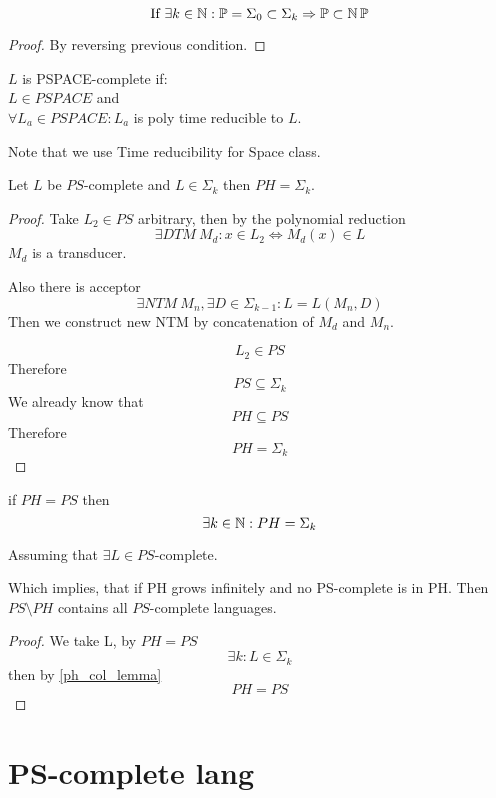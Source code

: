 \begin{consequence}
	\[ \text{If}\ \exists k \in \operatorname{\mathbb{N}}: \operatorname{\mathbb{P}} = \Sigma_0 \subset \Sigma_k \Rightarrow \operatorname{\mathbb{P}} \subset \operatorname{\operatorname{\mathbb{N}}\mathbb{P}} \]
\end{consequence}
\begin{proof}
	By reversing previous condition.
\end{proof}

\begin{definition}
	$L$ is PSPACE-complete if: \\
	$L \in PSPACE$ and\\
	$\forall L_a \in PSPACE: L_a$ is poly time reducible to $L$.

	Note that we use Time reducibility for Space class.
\end{definition}

\begin{lemma}[$PH = \Sigma_k$]\label{ph_col_lemma}
	Let $L$ be $PS$-complete and $L \in \Sigma_k$ then $PH = \Sigma_k$.
\end{lemma}
\begin{proof}
	Take $L_2 \in PS$ arbitrary, then by the polynomial reduction
	\[ \exists DTM\ M_d: x \in L_2 \iff M_d(x) \in L \]
	$M_d$ is a transducer.

	Also there is acceptor
	\[ \exists NTM\ M_n, \exists D \in \Sigma_{k - 1}: L = L(M_n, D) \]
	Then we construct new NTM by concatenation of $M_d$ and $M_n$.

	\[ L_2 \in PS \]
	Therefore
	\[ PS \subseteq \Sigma_k \]
	We already know that
	\[ PH \subseteq PS \]
	Therefore
	\[ PH = \Sigma_k \]
\end{proof}

\begin{consequence}
	if $PH = PS$ then
	\[ \exists k \in \operatorname{\mathbb{N}}: PH = \Sigma_k \]

	Assuming that $\exists L \in PS$-complete.

	Which implies, that if PH grows infinitely and no PS-complete is in PH.
	Then $PS \setminus PH$ contains all $PS$-complete languages.
\end{consequence}
\begin{proof}
	We take L, by $PH = PS$
	\[ \exists k: L \in \Sigma_k \]
	then by \cref{ph_col_lemma}
	\[ PH = PS \]
\end{proof}

\section{\texorpdfstring{PS-complete lang}{PS-complete lang}}
\vspace{5mm}
\large

